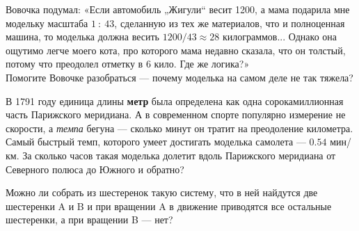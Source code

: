 ﻿
\begin{enumerate}
\itA Вовочка подумал: «Если автомобиль „Жигули“ весит \SI{1200}{}, а мама подарила мне модельку масштаба $1\ :\ 43$, сделанную из тех же материалов, что и полноценная машина, то моделька должна весить $1200 / 43 \approx 28$ килограммов... Однако она ощутимо легче моего кота, про которого мама недавно сказала, что он толстый, потому что преодолел отметку в 6 кило. Где же логика?» \smallskip \\
Помогите Вовочке разобраться — почему моделька на самом деле не так тяжела?

\itB В 1791 году единица длины {\bfseries метр} была определена как одна сорокамиллионная часть Парижского меридиана. А в современном спорте популярно измерение не скорости, а {\itshape темпа} бегуна — сколько минут он тратит на преодоление километра. \smallskip \\
Самый быстрый темп, которого умеет достигать моделька самолета — $0.54$ мин/км. За сколько часов такая моделька долетит вдоль Парижского меридиана от Северного полюса до Южного и обратно?

\itC Можно ли собрать из шестеренок такую систему, что в ней найдутся две шестеренки A и B и при вращении A в движение приводятся все остальные шестеренки, а при вращении B — нет?
\end{enumerate}